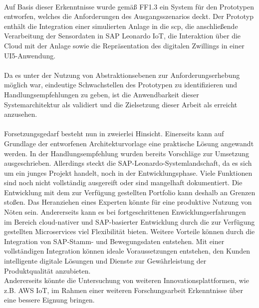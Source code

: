 \\ Auf Basis dieser Erkenntnisse wurde gemäß FF1.3 ein System für den Prototypen entworfen, welches die Anforderungen des Ausgangsszenarios deckt. Der Prototyp enthält die Integration einer simulierten Anlage in die \ac{scp}, die anschließende Verarbeitung der Sensordaten in SAP Leonardo IoT, die Interaktion über die Cloud mit der Anlage sowie die Repräsentation des digitalen Zwillings in einer UI5-Anwendung. 
\\\\%
Da es unter der Nutzung von Abstraktionsebenen zur Anforderungserhebung möglich war, eindeutige Schwachstellen des Prototypen zu identifizieren und Handlungsempfehlungen zu geben, ist die Anwendbarkeit dieser Systemarchitektur als validiert und die Zielsetzung dieser Arbeit als erreicht anzusehen. 
\\\\ Forsetzungsgedarf besteht nun in zweierlei Hinsicht. Einerseits kann auf Grundlage der entworfenen Architekturvorlage eine praktische Lösung angewandt werden. In der Handlungsempfehlung wurden bereits Vorschläge zur Umsetzung ausgeschrieben. Allerdings steckt die SAP-Leonardo-Systemlandschaft, da es sich um ein junges Projekt handelt, noch in der Entwicklungsphase. Viele Funktionen sind noch nicht vollständig ausgereift oder sind mangelhaft dokumentiert. Die Entwicklung mit dem zur Verfügung gestellten Portfolio kann deshalb an Grenzen stoßen. Das Heranziehen eines Experten könnte für eine produktive Nutzung von Nöten sein. Andererseits kann es bei fortgeschrittenen Enwicklungserfahrungen im Bereich cloud-nativer und SAP-basierter Entwicklung durch die zur Verfügung gestellten Microservices viel Flexibilität bieten.  Weitere Vorteile können durch die  Integration von SAP-Stamm- und Bewegungsdaten entstehen. Mit einer vollständigen Integration können ideale Voraussetzungen entstehen, den Kunden intelligente digitale Lösungen und Dienste zur Gewährleistung der Produktqualität anzubieten. 
\\Andererseits könnte die Untersuchung von weiteren Innovationsplattformen, wie z.B. AWS IoT, im Rahmen einer weiteren Forschungsarbeit Erkenntnisse über eine bessere Eignung bringen. 
\newpage
